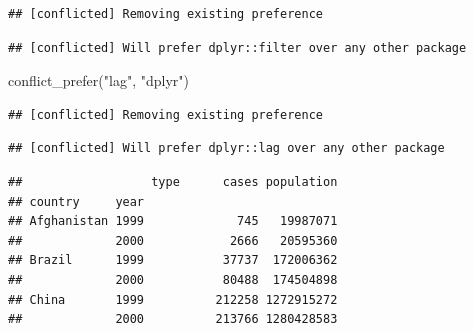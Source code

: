 \documentclass[]{book}
\newenvironment{Shaded}{}{}
\newcommand{\DataTypeTok}[1]{#1}
\newcommand{\KeywordTok}[1]{\textcolor[rgb]{0.00,0.00,1.00}{#1}}
\newcommand{\NormalTok}[1]{#1}
\newcommand{\OperatorTok}[1]{#1}
\newcommand{\StringTok}[1]{\textcolor[rgb]{0.00,0.50,0.50}{#1}}
\begin{document}
\begin{verbatim}
## [conflicted] Removing existing preference
\end{verbatim}

\begin{verbatim}
## [conflicted] Will prefer dplyr::filter over any other package
\end{verbatim}

\begin{Shaded}
\begin{Highlighting}[]
\KeywordTok{conflict_prefer}\NormalTok{(}\StringTok{"lag"}\NormalTok{, }\StringTok{"dplyr"}\NormalTok{)}
\end{Highlighting}
\end{Shaded}

\begin{verbatim}
## [conflicted] Removing existing preference
\end{verbatim}

\begin{verbatim}
## [conflicted] Will prefer dplyr::lag over any other package
\end{verbatim}

\begin{Shaded}
\end{Shaded}

\begin{verbatim}
##                  type      cases population
## country     year                           
## Afghanistan 1999             745   19987071
##             2000            2666   20595360
## Brazil      1999           37737  172006362
##             2000           80488  174504898
## China       1999          212258 1272915272
##             2000          213766 1280428583
\end{verbatim}

\begin{Shaded}
\end{Shaded}
\end{document}

